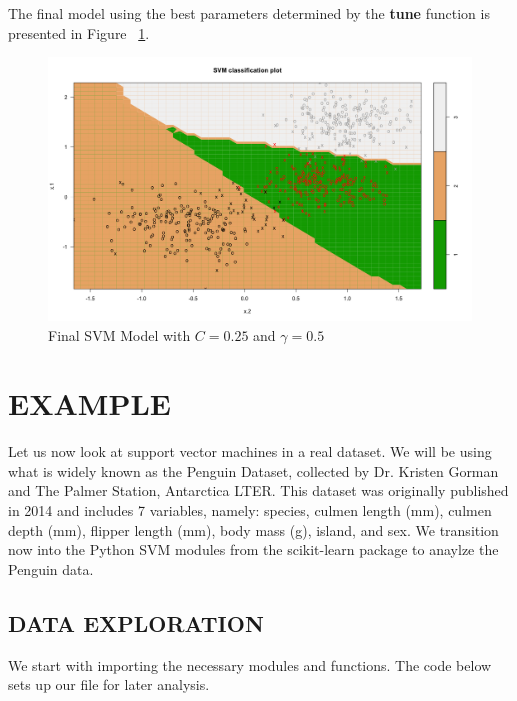 \documentclass[12pt]{article}
\begin{document}
The final model using the best parameters determined by the \textbf{tune} function is presented in Figure ~\ref{fig_final_svm_model}.

\begin{figure}[H]
    \centering
    \includegraphics[width=5in]{Figures/svm/svm_final_model.png}
    \caption{Final SVM Model with \(C=0.25\) and \(\gamma = 0.5\)}
    \label{fig_final_svm_model}
\end{figure}

\section{EXAMPLE}

Let us now look at support vector machines in a real dataset. We will be using what is widely known as the Penguin Dataset, collected by Dr. Kristen Gorman and The Palmer Station, Antarctica LTER. This dataset was originally published in 2014 and includes 7 variables, namely: species, culmen length (mm), culmen depth (mm), flipper length (mm), body mass (g), island, and sex. We transition now into the Python SVM modules from the scikit-learn package to anaylze the Penguin data.

\subsection{DATA EXPLORATION}

We start with importing the necessary modules and functions. The code below sets up our file for later analysis.
\end{document}
